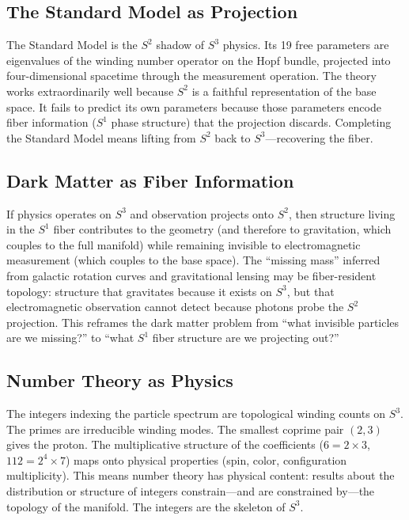 \documentclass[12pt]{article}
\begin{document}
\subsection{The Standard Model as Projection}

The Standard Model is the $S^2$ shadow of $S^3$ physics. Its 19 free parameters are eigenvalues of the winding number operator on the Hopf bundle, projected into four-dimensional spacetime through the measurement operation. The theory works extraordinarily well because $S^2$ is a faithful representation of the base space. It fails to predict its own parameters because those parameters encode fiber information ($S^1$ phase structure) that the projection discards. Completing the Standard Model means lifting from $S^2$ back to $S^3$---recovering the fiber.

\subsection{Dark Matter as Fiber Information}

If physics operates on $S^3$ and observation projects onto $S^2$, then structure living in the $S^1$ fiber contributes to the geometry (and therefore to gravitation, which couples to the full manifold) while remaining invisible to electromagnetic measurement (which couples to the base space). The ``missing mass'' inferred from galactic rotation curves and gravitational lensing may be fiber-resident topology: structure that gravitates because it exists on $S^3$, but that electromagnetic observation cannot detect because photons probe the $S^2$ projection. This reframes the dark matter problem from ``what invisible particles are we missing?'' to ``what $S^1$ fiber structure are we projecting out?''

\subsection{Number Theory as Physics}

The integers indexing the particle spectrum are topological winding counts on $S^3$. The primes are irreducible winding modes. The smallest coprime pair $(2,3)$ gives the proton. The multiplicative structure of the coefficients ($6 = 2 \times 3$, $112 = 2^4 \times 7$) maps onto physical properties (spin, color, configuration multiplicity). This means number theory has physical content: results about the distribution or structure of integers constrain---and are constrained by---the topology of the manifold. The integers are the skeleton of $S^3$.
\end{document}
